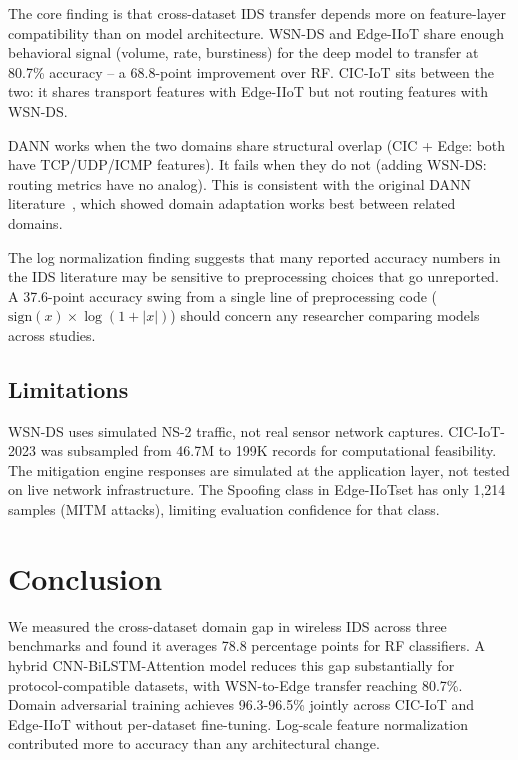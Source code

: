 \documentclass[conference]{IEEEtran}
\begin{document}
The core finding is that cross-dataset IDS transfer depends more on feature-layer compatibility than on model architecture. WSN-DS and Edge-IIoT share enough behavioral signal (volume, rate, burstiness) for the deep model to transfer at 80.7\% accuracy -- a 68.8-point improvement over RF. CIC-IoT sits between the two: it shares transport features with Edge-IIoT but not routing features with WSN-DS.

DANN works when the two domains share structural overlap (CIC + Edge: both have TCP/UDP/ICMP features). It fails when they do not (adding WSN-DS: routing metrics have no analog). This is consistent with the original DANN literature~\cite{ganin2016domain}, which showed domain adaptation works best between related domains.

The log normalization finding suggests that many reported accuracy numbers in the IDS literature may be sensitive to preprocessing choices that go unreported. A 37.6-point accuracy swing from a single line of preprocessing code ($\text{sign}(x) \times \log(1+|x|)$) should concern any researcher comparing models across studies.

\subsection{Limitations}

WSN-DS uses simulated NS-2 traffic, not real sensor network captures. CIC-IoT-2023 was subsampled from 46.7M to 199K records for computational feasibility. The mitigation engine responses are simulated at the application layer, not tested on live network infrastructure. The Spoofing class in Edge-IIoTset has only 1,214 samples (MITM attacks), limiting evaluation confidence for that class.

\section{Conclusion}

We measured the cross-dataset domain gap in wireless IDS across three benchmarks and found it averages 78.8 percentage points for RF classifiers. A hybrid CNN-BiLSTM-Attention model reduces this gap substantially for protocol-compatible datasets, with WSN-to-Edge transfer reaching 80.7\%. Domain adversarial training achieves 96.3-96.5\% jointly across CIC-IoT and Edge-IIoT without per-dataset fine-tuning. Log-scale feature normalization contributed more to accuracy than any architectural change.
\end{document}
